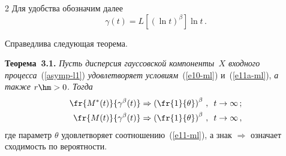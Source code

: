 \begin{multicols}{2}
Для удобства обозначим далее
\begin{equation*}
\gamma(t)=L\left[\left(\ln t
\right)^\beta\right]  \ln t \,.
\end{equation*}

Справедлива следующая теорема.


\medskip

\noindent
\textbf{Теорема~3.1.}
\textit{Пусть дисперсия гауссовской компоненты~$X$ входного  процесса}~(\ref{asymp-l1}) 
\textit{удовлетворяет условиям}~(\ref{e10-ml}) и~(\ref{e11a-ml}), \textit{а
также $r\hm>0$. Тогда}
\begin{align}
\fr{M^*(t)}{\gamma^\beta(t)} & \Rightarrow
\left(\fr{1}{\theta}\right)^\beta\,,\enskip t \to \infty\,;
\label{asymp1-l8}\\
\fr{M(t)}{\gamma^\beta(t)} &\Rightarrow
\left(\fr{1}{\theta}\right)^\beta\,,\enskip t \to \infty\,,
\label{asymp1-l9}
\end{align}
где параметр $\theta$ удовлетворяет соотношению~(\ref{e11-ml}), а знак
$\Rightarrow$ означает сходимость по вероятности.

\medskip



\end{multicols}
